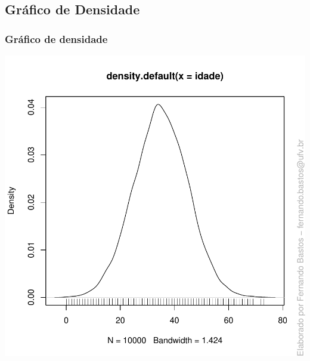 \documentclass[14pt,aspectratio=1610]{beamer}
\begin{document}
\subsection{Gráfico de Densidade}
\begin{frame}{}
\frametitle{Gráfico de densidade}
\begin{block}{}
\begin{center}
\includegraphics{Aula5-idade2}
\end{center}
\end{block}
\nocite{Morettin09, Apostila, eric, montgomery2016, Bastos2025}
\end{frame}


\begin{frame}[allowframebreaks]
\frametitle{}
\printbibliography
\end{frame}
\end{document}
